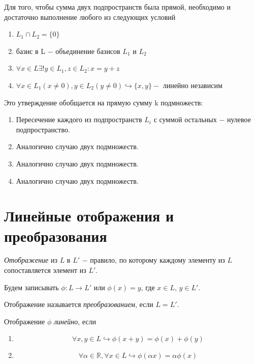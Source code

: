 \begin{proposition}
Для того, чтобы сумма двух подпространств была прямой, необходимо и достаточно выполнение любого из следующих условий
\begin{enumerate}
    \item $L_1 \cap L_2 = \{0\}$
    \item базис в L $-$ объединение базисов $L_1$ и $L_2$
    \item $\forall x \in L \exists ! y \in L_1, z \in L_2 : x = y + z$
    \item $\forall x \in L_1 (x \neq 0), y \in L_2 (y \neq 0) \hookrightarrow \{x, y\} -$ линейно независим
\end{enumerate}
\end{proposition}

Это утверждение обобщается на прямую сумму k подмножеств:
\begin{enumerate}
    \item Пересечение каждого из подпространств $L_i$ с суммой остальных $-$ нулевое подпространство.
    \item Аналогично случаю двух подмножеств.
    \item Аналогично случаю двух подмножеств.
    \item Аналогично случаю двух подмножеств.
\end{enumerate}


\section{Линейные отображения и преобразования}

\begin{definition}
    \textit{Отображение} из $L$ в $L'$ $-$ правило, по которому каждому элементу из $L$ сопоставляется элемент из $L'$.
\end{definition}

Будем записывать $\phi : L \longrightarrow L'$ или $\phi(x) = y$, где $x \in L$, $y \in L'$.
\begin{definition}
    Отображение называется \textit{преобразованием}, если $L = L'$.
\end{definition}

\begin{definition}
    Отображение $\phi$ \textit{линейно}, если
    \begin{enumerate}
        \item 
        \[
        \forall x, y \in L \hookrightarrow \phi(x + y) = \phi(x) + \phi(y)
        \]
        \item \[
        \forall \alpha \in \mathbb{R}, \forall x \in L \hookrightarrow \phi(\alpha x) = \alpha\phi(x)
        \]
    \end{enumerate}
\end{definition}

